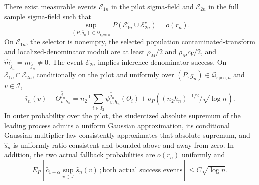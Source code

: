 There exist measurable events \(\mathcal E_{1n}\) in the pilot sigma-field and \(\mathcal E_{2n}\) in the full sample sigma-field such that
\[
 \sup_{(P,\bar g_n)\in\mathcal Q_{\mathrm{spec},n}}
 P(\mathcal E_{1n}^c\cup\mathcal E_{2n}^c)=o(r_n).
\]
On \(\mathcal E_{1n}\), the selector is nonempty, the selected population contaminated-transform and localized-denominator moduli are at least \(\rho_M/2\) and \(\rho_Mc_V/2\), and \(\widehat m_{\widehat j_n}=m_{\widehat j_n}\ne0\).  The event \(\mathcal E_{2n}\) implies inference-denominator success.  On \(\mathcal E_{1n}\cap\mathcal E_{2n}\), conditionally on the pilot and uniformly over \((P,\bar g_n)\in\mathcal Q_{\mathrm{spec},n}\) and \(v\in\mathcal I\),
\[
 \widehat\tau_n(v)-\Theta^{\widehat j_n}_{v,h_n}
 =n_2^{-1}\sum_{i\in I_2}\psi^{\widehat j_n}_{v,h_n}(O_i)
 +o_P\!\left((n_2h_n)^{-1/2}/\sqrt{\log n}\right).
\]
In outer probability over the pilot, the studentized absolute supremum of the leading process admits a uniform Gaussian approximation, its conditional Gaussian multiplier law consistently approximates that absolute supremum, and \(\widehat s_n\) is uniformly ratio-consistent and bounded above and away from zero.  In addition, the two actual fallback probabilities are \(o(r_n)\) uniformly and
\[
 E_P\!\left[\widehat c_{1-\alpha}\sup_{v\in\mathcal I}\widehat s_n(v)\,; \text{both actual success events}\right]\le C\sqrt{\log n}.
\]